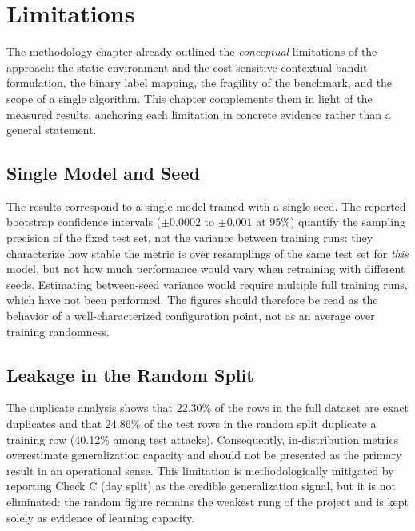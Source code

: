 \chapter{Limitations}

The methodology chapter already outlined the \emph{conceptual} limitations of the approach: the static environment and the cost-sensitive contextual bandit formulation, the binary label mapping, the fragility of the benchmark, and the scope of a single algorithm. This chapter complements them in light of the measured results, anchoring each limitation in concrete evidence rather than a general statement.

\section{Single Model and Seed}
The results correspond to a single model trained with a single seed. The reported bootstrap confidence intervals ($\pm 0.0002$ to $\pm 0.001$ at 95\%) quantify the sampling precision of the fixed test set, not the variance between training runs: they characterize how stable the metric is over resamplings of the same test set for \emph{this} model, but not how much performance would vary when retraining with different seeds. Estimating between-seed variance would require multiple full training runs, which have not been performed. The figures should therefore be read as the behavior of a well-characterized configuration point, not as an average over training randomness.

\section{Leakage in the Random Split}
The duplicate analysis shows that 22.30\% of the rows in the full dataset are exact duplicates and that 24.86\% of the test rows in the random split duplicate a training row (40.12\% among test attacks). Consequently, in-distribution metrics overestimate generalization capacity and should not be presented as the primary result in an operational sense. This limitation is methodologically mitigated by reporting Check C (day split) as the credible generalization signal, but it is not eliminated: the random figure remains the weakest rung of the project and is kept solely as evidence of learning capacity.

